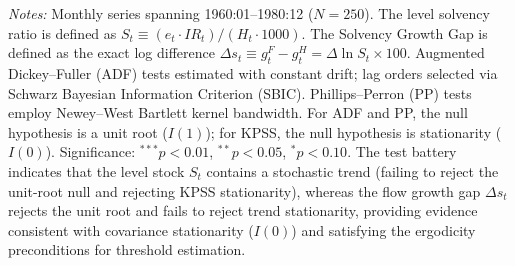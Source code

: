 \begin{table}[htbp]
\centering
\small
\renewcommand{\arraystretch}{0.92}
\caption{Integration Order Diagnostics for Central Bank Solvency Variables (1960:01--1980:12)}
\label{tab:solvency_unit_root}
\label{tab:tab03_solvency_unit_root}
\begin{minipage}{\textwidth}
\vspace{0.4em}
\footnotesize \textit{Notes:} Monthly series spanning 1960:01--1980:12 ($N=250$). The level solvency ratio is defined as $S_t \equiv (e_t \cdot IR_t) / (H_t \cdot 1000)$. The Solvency Growth Gap is defined as the exact log difference $\Delta s_t \equiv g^F_t - g^H_t = \Delta \ln S_t \times 100$. Augmented Dickey--Fuller (ADF) tests estimated with constant drift; lag orders selected via Schwarz Bayesian Information Criterion (SBIC). Phillips--Perron (PP) tests employ Newey--West Bartlett kernel bandwidth. For ADF and PP, the null hypothesis is a unit root ($I(1)$); for KPSS, the null hypothesis is stationarity ($I(0)$). Significance: $^{***} p < 0.01$, $^{**} p < 0.05$, $^{*} p < 0.10$. The test battery indicates that the level stock $S_t$ contains a stochastic trend (failing to reject the unit-root null and rejecting KPSS stationarity), whereas the flow growth gap $\Delta s_t$ rejects the unit root and fails to reject trend stationarity, providing evidence consistent with covariance stationarity ($I(0)$) and satisfying the ergodicity preconditions for \citet{Hansen1997,Hansen2000} threshold estimation.
\end{minipage}
\end{table}
